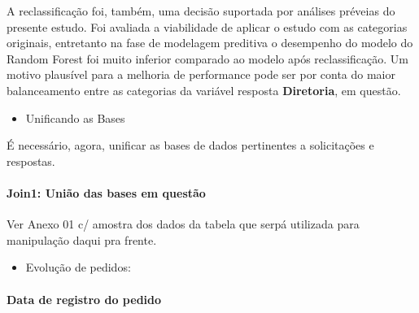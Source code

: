 \documentclass[]{article}
\newenvironment{Shaded}{\begin{snugshade}}{\end{snugshade}}
\newcommand{\KeywordTok}[1]{\textcolor[rgb]{0.13,0.29,0.53}{\textbf{#1}}}
\newcommand{\DataTypeTok}[1]{\textcolor[rgb]{0.13,0.29,0.53}{#1}}
\newcommand{\StringTok}[1]{\textcolor[rgb]{0.31,0.60,0.02}{#1}}
\newcommand{\CommentTok}[1]{\textcolor[rgb]{0.56,0.35,0.01}{\textit{#1}}}
\newcommand{\OperatorTok}[1]{\textcolor[rgb]{0.81,0.36,0.00}{\textbf{#1}}}
\newcommand{\NormalTok}[1]{#1}
\providecommand{\tightlist}{%
  \setlength{\itemsep}{0pt}\setlength{\parskip}{0pt}}
\let\oldparagraph\paragraph
\renewcommand{\paragraph}[1]{\oldparagraph{#1}\mbox{}}
\begin{document}
A reclassificação foi, também, uma decisão suportada por análises
préveias do presente estudo. Foi avaliada a viabilidade de aplicar o
estudo com as categorias originais, entretanto na fase de modelagem
preditiva o desempenho do modelo do Random Forest foi muito inferior
comparado ao modelo após reclassificação. Um motivo plausível para a
melhoria de performance pode ser por conta do maior balanceamento entre
as categorias da variável resposta \textbf{Diretoria}, em questão.

\begin{itemize}
\tightlist
\item
  Unificando as Bases
\end{itemize}

É necessário, agora, unificar as bases de dados pertinentes a
solicitações e respostas.

\paragraph{Join1: União das bases em
questão}\label{join1-uniao-das-bases-em-questao}

\begin{Shaded}
\end{Shaded}

Ver Anexo 01 c/ amostra dos dados da tabela que serpá utilizada para
manipulação daqui pra frente.

\begin{itemize}
\tightlist
\item
  Evolução de pedidos:
\end{itemize}

\paragraph{Data de registro do pedido}\label{data-de-registro-do-pedido}
\end{document}
